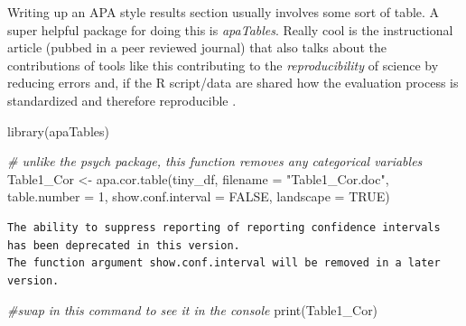 \documentclass[
  english,
]{book}
\newenvironment{Shaded}{\begin{snugshade}}{\end{snugshade}}
\newcommand{\AttributeTok}[1]{\textcolor[rgb]{0.77,0.63,0.00}{#1}}
\newcommand{\CommentTok}[1]{\textcolor[rgb]{0.56,0.35,0.01}{\textit{#1}}}
\newcommand{\ConstantTok}[1]{\textcolor[rgb]{0.00,0.00,0.00}{#1}}
\newcommand{\DecValTok}[1]{\textcolor[rgb]{0.00,0.00,0.81}{#1}}
\newcommand{\FunctionTok}[1]{\textcolor[rgb]{0.00,0.00,0.00}{#1}}
\newcommand{\NormalTok}[1]{#1}
\newcommand{\OtherTok}[1]{\textcolor[rgb]{0.56,0.35,0.01}{#1}}
\newcommand{\StringTok}[1]{\textcolor[rgb]{0.31,0.60,0.02}{#1}}
\begin{document}
Writing up an APA style results section usually involves some sort of table. A super helpful package for doing this is \emph{apaTables}. Really cool is the instructional article (pubbed in a peer reviewed journal) that also talks about the contributions of tools like this contributing to the \emph{reproducibility} of science by reducing errors and, if the R script/data are shared how the evaluation process is standardized and therefore reproducible \citep{stanley_reproducible_2018}.

\begin{Shaded}
\begin{Highlighting}[]
\FunctionTok{library}\NormalTok{(apaTables)}
\end{Highlighting}
\end{Shaded}

\begin{Shaded}
\begin{Highlighting}[]
\CommentTok{\# unlike the psych package, this function removes any categorical variables}
\NormalTok{Table1\_Cor }\OtherTok{\textless{}{-}} \FunctionTok{apa.cor.table}\NormalTok{(tiny\_df, }\AttributeTok{filename =} \StringTok{"Table1\_Cor.doc"}\NormalTok{, }\AttributeTok{table.number =} \DecValTok{1}\NormalTok{, }\AttributeTok{show.conf.interval =} \ConstantTok{FALSE}\NormalTok{, }\AttributeTok{landscape =} \ConstantTok{TRUE}\NormalTok{)}
\end{Highlighting}
\end{Shaded}

\begin{verbatim}
The ability to suppress reporting of reporting confidence intervals has been deprecated in this version.
The function argument show.conf.interval will be removed in a later version.
\end{verbatim}

\begin{Shaded}
\begin{Highlighting}[]
\CommentTok{\#swap in this command to see it in the console}
\FunctionTok{print}\NormalTok{(Table1\_Cor) }
\end{Highlighting}
\end{Shaded}
\end{document}
